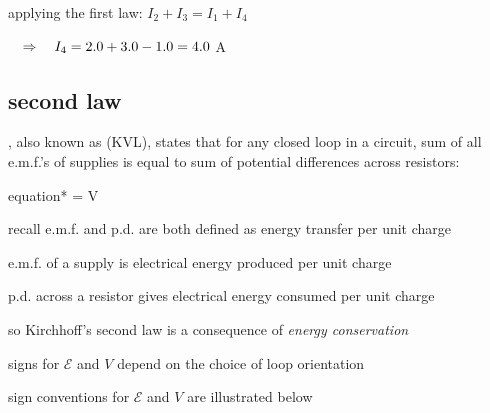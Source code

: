 
\begin{soln} applying the first law: $I_2 + I_3 = I_1 + I_4$
	
	\eqskip $\quad \Rightarrow \quad I_4 = 2.0 + 3.0 - 1.0 = 4.0$ A \end{soln}
	


\subsection{second law}

\begin{ilight}
	, also known as  (KVL), states that for any closed loop in a circuit, sum of all e.m.f.'s of supplies is equal to sum of potential differences across resistors: \begin{empheq}[box=\tcbhighmath]{equation*}{\sum {} = \sum V }\end{empheq}
\end{ilight}

\cmt recall e.m.f. and p.d. are both defined as energy transfer per unit charge

e.m.f. of a supply is electrical energy produced per unit charge

p.d. across a resistor gives electrical energy consumed per unit charge

so Kirchhoff's second law is a consequence of \emph{energy conservation}

\cmt signs for $\mathcal{E}$ and $V$ depend on the choice of loop orientation

sign conventions for $\mathcal{E}$ and $V$ are illustrated below

